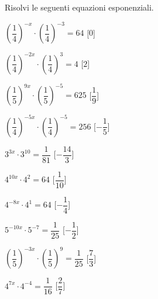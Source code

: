 \begin{esercizio}\label{ese:}
 Risolvi le seguenti equazioni esponenziali.
 \begin{enumeratea}
  \item  \(\left(\dfrac{1}{4}\right)^{-x} \cdot 
\left(\dfrac{1}{4}\right)^{-3} = 
64\)
   \hfill [\(0\)]
  \item  \(\left(\dfrac{1}{4}\right)^{-2x} \cdot 
\left(\dfrac{1}{4}\right)^{3} = 
4\)
   \hfill [\(2\)]
  \item  \(\left(\dfrac{1}{5}\right)^{9x} \cdot 
\left(\dfrac{1}{5}\right)^{-5} = 
625\)
   \hfill [\(\dfrac{1}{9}\)]
  \item  \(\left(\dfrac{1}{4}\right)^{-5x} \cdot 
\left(\dfrac{1}{4}\right)^{-5} = 
256\)
   \hfill [\(-\dfrac{1}{5}\)]
  \item  \(3^{3x} \cdot 3^{10} = \dfrac{1}{81}\)
   \hfill [\(-\dfrac{14}{3}\)]
  \item  \(4^{10x} \cdot 4^{2} = 64\)
   \hfill [\(\dfrac{1}{10}\)]
  \item  \(4^{-8x} \cdot 4^{1} = 64\)
   \hfill [\(-\dfrac{1}{4}\)]
  \item  \(5^{-10x} \cdot 5^{-7} = \dfrac{1}{25}\)
   \hfill [\(-\dfrac{1}{2}\)]
  \item  \(\left(\dfrac{1}{5}\right)^{-3x} \cdot 
\left(\dfrac{1}{5}\right)^{9} = 
\dfrac{1}{25}\)
   \hfill [\(\dfrac{7}{3}\)]
  \item  \(4^{7x} \cdot 4^{-4} = \dfrac{1}{16}\)
   \hfill [\(\dfrac{2}{7}\)]
 \end{enumeratea}
\end{esercizio}



